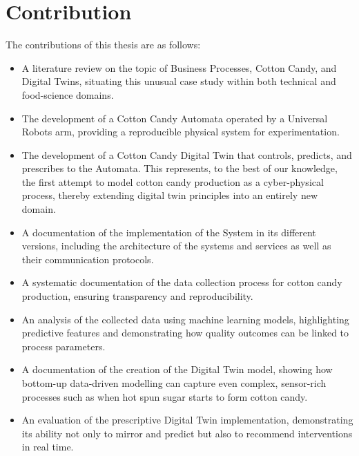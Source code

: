 \section{Contribution}
\label{sec:intro:con}

The contributions of this thesis are as follows:
\begin{itemize}
    \item A literature review on the topic of Business Processes, Cotton Candy, and Digital Twins, situating this unusual case study within both technical and food-science domains.
    \item The development of a Cotton Candy Automata operated by a Universal Robots arm, providing a reproducible physical system for experimentation.
    \item The development of a Cotton Candy Digital Twin that controls, predicts, and prescribes to the Automata. This represents, to the best of our knowledge, the first attempt to model cotton candy production as a cyber-physical process, thereby extending digital twin principles into an entirely new domain.
    \item A documentation of the implementation of the System in its different versions, including the architecture of the systems and services as well as their communication protocols.
    \item A systematic documentation of the data collection process for cotton candy production, ensuring transparency and reproducibility.
    \item An analysis of the collected data using machine learning models, highlighting predictive features and demonstrating how quality outcomes can be linked to process parameters.
    \item A documentation of the creation of the Digital Twin model, showing how bottom-up data-driven modelling can capture even complex, sensor-rich processes such as when hot spun sugar starts to form cotton candy.
    \item An evaluation of the prescriptive Digital Twin implementation, demonstrating its ability not only to mirror and predict but also to recommend interventions in real time.
\end{itemize}





